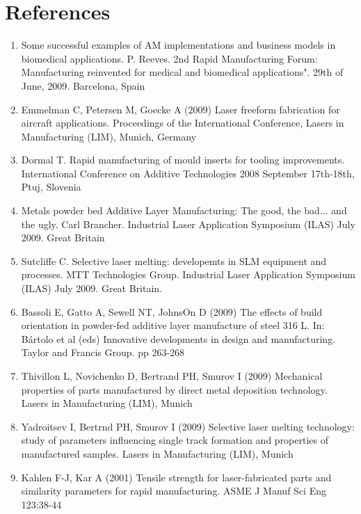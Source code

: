 \documentclass[10pt]{article}
\begin{document}
\section*{References}
\begin{enumerate}
  \item Some successful examples of AM implementations and business models in biomedical applications. P. Reeves. 2nd Rapid Manufacturing Forum: Manufacturing reinvented for medical and biomedical applications". 29th of June, 2009. Barcelona, Spain

  \item Emmelman C, Petersen M, Goecke A (2009) Laser freeform fabrication for aircraft applications. Proceedings of the International Conference, Lasers in Manufacturing (LIM), Munich, Germany

  \item Dormal T. Rapid manufacturing of mould inserts for tooling improvements. International Conference on Additive Technologies 2008 September 17th-18th, Ptuj, Slovenia

  \item Metals powder bed Additive Layer Manufacturing: The good, the bad... and the ugly. Carl Brancher. Industrial Laser Application Symposium (ILAS) July 2009. Great Britain

  \item Sutcliffe C. Selective laser melting: developemts in SLM equipment and processes. MTT Technologies Group. Industrial Laser Application Symposium (ILAS) July 2009. Great Britain.

  \item Bassoli E, Gatto A, Sewell NT, JohnsOn D (2009) The effects of build orientation in powder-fed additive layer manufacture of steel 316 L. In: Bártolo et al (eds) Innovative developments in design and manufacturing. Taylor and Francis Group. pp 263-268

  \item Thivillon L, Novichenko D, Bertrand PH, Smurov I (2009) Mechanical properties of parts manufactured by direct metal deposition technology. Lasers in Manufacturing (LIM), Munich

  \item Yadroitsev I, Bertrnd PH, Smurov I (2009) Selective laser melting technology: study of parameters influencing single track formation and properties of manufactured samples. Lasers in Manufacturing (LIM), Munich

  \item Kahlen F-J, Kar A (2001) Tensile strength for laser-fabricated parts and similarity parameters for rapid manufacturing. ASME J Manuf Sci Eng 123:38-44

\end{enumerate}
\end{document}
